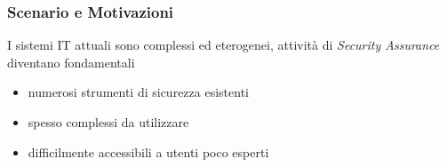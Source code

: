 \frame{\titlepage}

\begin{frame}
    \frametitle{Scenario e Motivazioni}
    I sistemi IT attuali sono \alert{complessi} ed \alert{eterogenei}, attività di \alert{\textit{Security Assurance}} diventano fondamentali 
    \begin{itemize}
        \item numerosi strumenti di sicurezza esistenti
        \item spesso \alert{complessi} da utilizzare
        \item difficilmente accessibili a utenti poco esperti
    \end{itemize}
\end{frame}


